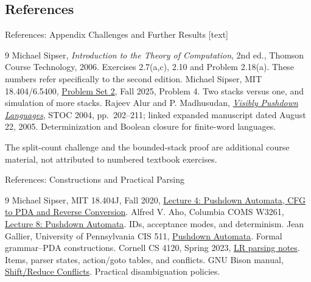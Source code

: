 \documentclass[10pt]{beamer}
\begin{document}
\subsection{References}

\begin{frame}{References: Appendix Challenges and Further Results}
  \small
  [text]
  \begin{thebibliography}{9}
      Michael Sipser, \emph{Introduction to the Theory of Computation},
      2nd ed., Thomson Course Technology, 2006.
      Exercises 2.7(a,c), 2.10 and Problem 2.18(a).
      These numbers refer specifically to the second edition.
      Michael Sipser, MIT 18.404/6.5400,
      \href{https://math.mit.edu/~sipser/18404/hw2.pdf}
      {Problem Set 2}, Fall 2025, Problem 4.
      Two stacks versus one, and simulation of more stacks.
      Rajeev Alur and P. Madhusudan,
      \href{https://www.cis.upenn.edu/~alur/Stoc04.pdf}
      {\emph{Visibly Pushdown Languages}}, STOC 2004, pp.\ 202--211;
      linked expanded manuscript dated August 22, 2005.
      Determinization and Boolean closure for finite-word languages.
  \end{thebibliography}
  The split-count challenge and the bounded-stack proof are additional
  course material, not attributed to numbered textbook exercises.
\end{frame}

\begin{frame}{References: Constructions and Practical Parsing}
  \footnotesize
  \begin{thebibliography}{9}
      Michael Sipser, MIT 18.404J, Fall 2020,
      \href{https://ocw.mit.edu/courses/18-404j-theory-of-computation-fall-2020/resources/pushdown-automata-cfg-2194-pda/}
      {Lecture 4: Pushdown Automata, CFG to PDA and Reverse Conversion}.
      Alfred V. Aho, Columbia COMS W3261,
      \href{https://www.cs.columbia.edu/~aho/cs3261/Lectures/L8-PDA.html}
      {Lecture 8: Pushdown Automata}. IDs, acceptance modes, and determinism.
      Jean Gallier, University of Pennsylvania CIS 511,
      \href{https://www.seas.upenn.edu/~cis5110/notes/cis511-sl8.pdf}
      {Pushdown Automata}. Formal grammar--PDA constructions.
      Cornell CS 4120, Spring 2023,
      \href{https://www.cs.cornell.edu/courses/cs4120/2023sp/notes/lr/}
      {LR parsing notes}. Items, parser states, action/goto tables, and conflicts.
      GNU Bison manual,
      \href{https://www.gnu.org/software/bison/manual/html_node/Shift_002fReduce.html}
      {Shift/Reduce Conflicts}. Practical disambiguation policies.
  \end{thebibliography}
\end{frame}
\end{document}
